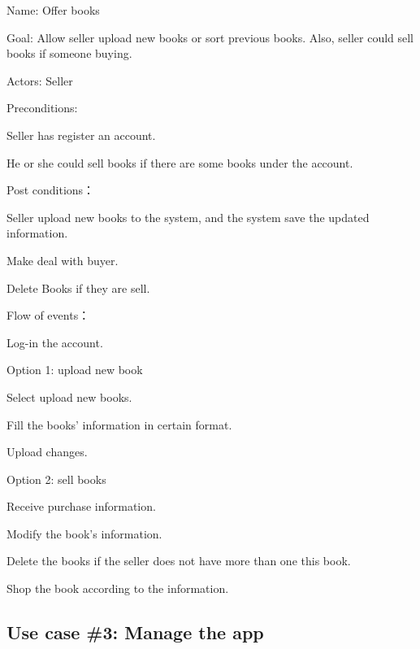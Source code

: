 \documentclass[12pt]{article}
\begin{document}
Name: Offer books \par
 Goal: Allow seller upload new books or sort previous books. Also, seller could sell books if someone buying. \par
Actors: Seller \par
Preconditions: \par
        \quad 	Seller has register an account. \par
        \quad 	He or she could sell books if there are some books under the account. \par
Post conditions： \par
        	\quad Seller upload new books to the system, and the system save the updated information. \par
        	\quad Make deal with buyer. \par
        	\quad Delete Books if they are sell. \par
Flow of events： \par
        \quad 	Log-in the account. \par
       \quad 	Option 1: upload new book \par
              \quad \quad       	Select upload new books. \par
                  \quad \quad   	Fill the books’ information in certain format. \par
             \quad \quad        	Upload changes. \par
        	\quad Option 2: sell books \par
                 \quad \quad    	Receive purchase information. \par
                    	\quad \quad  Modify the book’s information. \par
                    \quad \quad 	Delete the books if the seller does not have more than one this book. \par
                    	\quad \quad  Shop the book according to the information.   \par      

		\subsection{Use case \#3: Manage the app}
\end{document}
